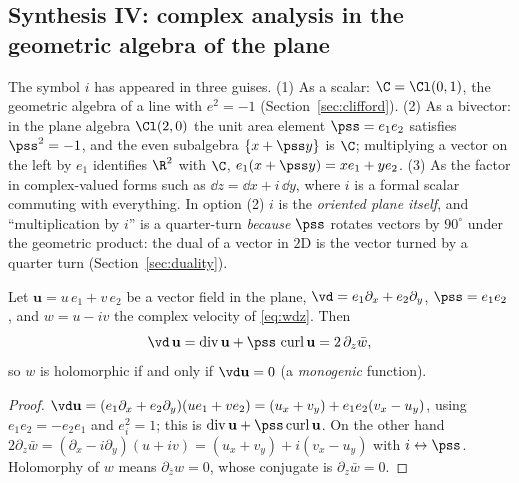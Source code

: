 \subsection{Synthesis IV: complex analysis in the geometric algebra of the plane}\label{sec:synth4}

\begin{synthesis}
The symbol $i$ has appeared in three guises. (1) As a scalar: $\C=\Cl(0,1)$, the geometric algebra of a line with $e^2=-1$ (Section~\ref{sec:clifford}). (2) As a bivector: in the plane algebra $\Cl(2,0)$ the unit area element $\pss=e_1e_2$ satisfies $\pss^2=-1$, and the even subalgebra $\{x+\pss y\}$ is $\C$; multiplying a vector on the left by $e_1$ identifies $\R^2$ with $\C$, $e_1(x+\pss y)=xe_1+ye_2$. (3) As the factor in complex-valued forms such as $\dd z=\dd x+i\,\dd y$, where $i$ is a formal scalar commuting with everything.
In option (2) $i$ is the \emph{oriented plane itself}, and ``multiplication by $i$'' is a quarter-turn \emph{because} $\pss$ rotates vectors by $90^\circ$ under the geometric product: the dual of a vector in $2$D is the vector turned by a quarter turn (Section~\ref{sec:duality}).
\end{synthesis}

\begin{proposition}\label{prop:CRga}
Let $\mathbf u=u\,e_1+v\,e_2$ be a vector field in the plane, $\vd=e_1\partial_x+e_2\partial_y$, $\pss=e_1e_2$, and $w=u-iv$ the complex velocity of \eqref{eq:wdz}. Then
\[
\vd\,\mathbf u=\operatorname{div}\mathbf u+\pss\,\operatorname{curl}\mathbf u=2\,\partial_z\bar w,
\]
so $w$ is holomorphic if and only if $\vd\mathbf u=0$ (a \emph{monogenic} function).
\end{proposition}
\begin{proof}
$\vd\mathbf u=(e_1\partial_x+e_2\partial_y)(ue_1+ve_2)=(u_x+v_y)+e_1e_2(v_x-u_y)$, using $e_1e_2=-e_2e_1$ and $e_i^2=1$; this is $\operatorname{div}\mathbf u+\pss\operatorname{curl}\mathbf u$. On the other hand $2\partial_z\bar w=(\partial_x-i\partial_y)(u+iv)=(u_x+v_y)+i(v_x-u_y)$ with $i\leftrightarrow\pss$. Holomorphy of $w$ means $\partial_{\bar z}w=0$, whose conjugate is $\partial_z\bar w=0$.
\end{proof}

